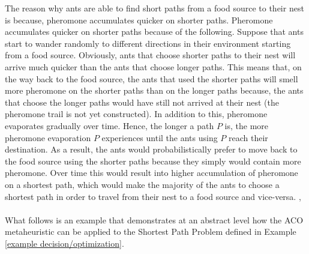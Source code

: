 \documentclass[12pt]{article}
\numberwithin{equation}{subsection}
\numberwithin{table}{subsection}
\begin{document}
The reason why ants are able to find short paths from a food source to their nest is because, pheromone accumulates quicker on shorter paths. Pheromone accumulates quicker on shorter paths because of the following. Suppose that ants start to wander randomly to different directions in their environment starting from a food source. Obviously, ants that choose shorter paths to their nest will arrive much quicker than the ants that choose longer paths. This means that, on the way back to the food source, the ants that used the shorter paths will smell more pheromone on the shorter paths than on the longer paths because, the ants that choose the longer paths would have still not arrived at their nest (the pheromone trail is not yet constructed). In addition to this, pheromone evaporates gradually over time. Hence, the longer a path $P$ is, the more pheromone evaporation $P$ experiences until the ants using $P$ reach their destination. As a result, the ants would probabilistically prefer to move back to the food source using the shorter paths because they simply would contain more pheromone. Over time this would result into higher accumulation of pheromone on a shortest path, which would make the majority of the ants to choose a shortest path in order to travel from their nest to a food source and vice-versa. \cite{dorigo_gambardella_1997}, \cite{dorigo_stutzle_thomas_2004}\\\\
What follows is an example that demonstrates at an abstract level how the ACO metaheuristic can be applied to the Shortest Path Problem defined in Example \ref{example decision/optimization}.
\end{document}
